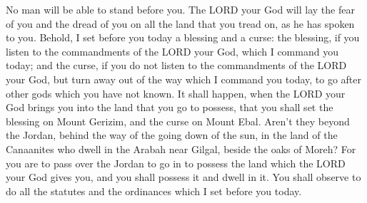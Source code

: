 \myverse{}No man will be able to stand before you. The LORD your God will lay the fear
of you and the dread of you on all the land that you tread on, as he has spoken to you.
\myverse{}Behold, I set before you today a blessing and a curse:
\myverse{}the blessing, if you listen to the commandments of the LORD your God, which
I command you today;
\myverse{}and the curse, if you do not listen to the commandments of the LORD your
God, but turn away out of the way which I command you today, to go after other gods which you have not
known.
\myverse{}It shall happen, when the LORD your God brings you into the land that you
go to possess, that you shall set the blessing on Mount Gerizim, and the curse on Mount Ebal.
\myverse{}Aren’t they beyond the Jordan, behind the way of the going down of the sun,
in the land of the Canaanites who dwell in the Arabah near Gilgal, beside the oaks of Moreh?
\myverse{}For you are to pass over the Jordan to go in to possess the land which the
LORD your God gives you, and you shall possess it and dwell in it.
\myverse{}You shall observe to do all the statutes and the ordinances which I set before
you today.


